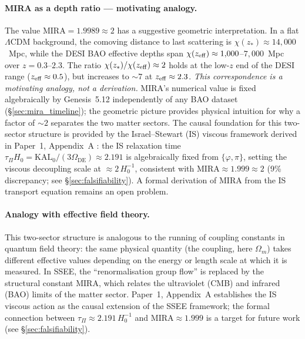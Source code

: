 \documentclass[12pt,a4paper]{article}
\begin{document}
\paragraph{MIRA as a depth ratio — motivating analogy.}
The value MIRA$=1.9989\approx2$ has a suggestive geometric interpretation.
In a flat $\Lambda$CDM background, the comoving distance to last scattering
is $\chi(z_*)\approx14{,}000$~Mpc, while the DESI BAO effective depths span
$\chi(z_{\rm eff})\approx1{,}000$--$7{,}000$~Mpc over $z=0.3$--$2.3$.
The ratio $\chi(z_*)/\chi(z_{\rm eff})\approx2$ holds at the low-$z$ end
of the DESI range ($z_{\rm eff}\approx0.5$), but increases to $\sim7$ at
$z_{\rm eff}\approx2.3$.
\emph{This correspondence is a motivating analogy, not a derivation.}
MIRA's numerical value is fixed algebraically by Genesis~5.12
independently of any BAO dataset (\S\ref{sec:mira_timeline});
the geometric picture provides physical intuition for why a factor of $\sim2$
separates the two matter sectors.
The causal foundation for this two-sector structure is provided by the
Israel--Stewart (IS) viscous framework derived in Paper~1, Appendix~A
\citep{AlmeidaSSEE2026paper1}: the IS relaxation time
$\tau_\Pi H_0 = \mathrm{KAL}_0/(3\Omega_{\mathrm{DE}}) \approx 2.191$
is algebraically fixed from $\{\varphi,\pi\}$, setting the viscous
decoupling scale at $\approx 2\,H_0^{-1}$, consistent with
$\mathrm{MIRA}\approx1.999\approx2$ (9\% discrepancy; see \S\ref{sec:falsifiability}).
A formal derivation of MIRA from the IS transport equation remains
an open problem.

\paragraph{Analogy with effective field theory.}
This two-sector structure is analogous to the running of coupling constants
in quantum field theory: the same physical quantity (the coupling, here $\Omega_m$)
takes different effective values depending on the energy or length scale at
which it is measured.
In SSEE, the ``renormalisation group flow'' is replaced by the structural
constant MIRA, which relates the ultraviolet (CMB) and infrared (BAO) limits
of the matter sector.
Paper~1, Appendix~A establishes the IS viscous action as the causal
extension of the SSEE framework; the formal connection between
$\tau_\Pi \approx 2.191\,H_0^{-1}$ and $\mathrm{MIRA}\approx1.999$
is a target for future work (see \S\ref{sec:falsifiability}).
\end{document}
